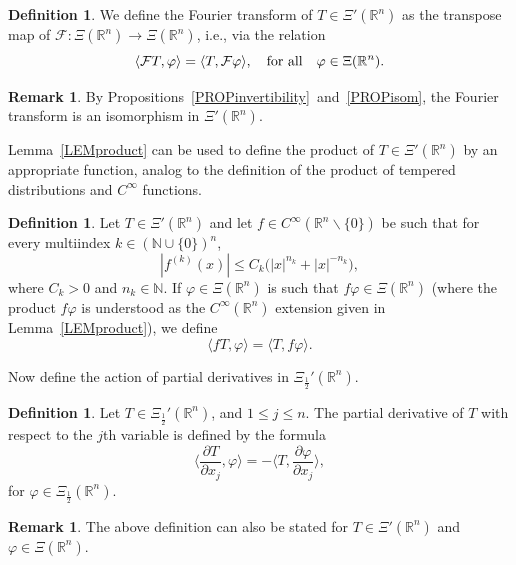 \documentclass[reqno,11pt]{amsart}
\theoremstyle{definition}
\newtheorem{definition}[theorem]{Definition}
\newtheorem{remark}[theorem]{Remark}
\def\R{\mathbb{R}}
\begin{document}
\begin{definition}\label{ALBERTO}
	We define the Fourier  transform of $ T\in \Xi'(\R^n)$ as the transpose map of $\mathcal{F}:\Xi(\R^n)\to \Xi(\R^n)$, i.e., via the relation
	\[
	\langle \mathcal{F}T,\varphi \rangle = \langle T,\mathcal{F}\varphi\rangle,\ \ \ {\rm for\ all}\ \ \ \varphi\in\Xi(\R^n).
	\]
\end{definition}
\begin{remark}
	By Propositions~\ref{PROPinvertibility}~and~\ref{PROPisom}, the Fourier transform is an isomorphism in $\Xi'(\R^n)$.
\end{remark}

Lemma~\ref{LEMproduct} can be used to define the product of $T\in \Xi'(\R^n)$ by an appropriate function, analog to the definition of the product of tempered distributions and $C^\infty$ functions.
\begin{definition}\label{DEFproddistbyfunct}
	Let $T\in \Xi'(\R^n)$ and let $f\in C^\infty(\R^n\backslash\{0\})$ be such that for every multiindex $k\in (\mathbb{N}\cup\{0\})^n$,
	\begin{equation}
		\label{EQfderivatives}
		|f^{(k)}(x)|\leq C_k\big( |x|^{n_k}+|x|^{-n_k}\big),
	\end{equation}
	where $C_k>0$ and $n_k\in\mathbb{N}$. If $\varphi\in \Xi(\R^n)$ is such that $f\varphi\in \Xi(\R^n)$ (where the product $f\varphi$ is understood as the $C^{\infty}(\R^n)$ extension given in Lemma~\ref{LEMproduct}), we define
	\[
	\langle fT,\varphi\rangle =\langle T,f\varphi\rangle.
	\]
\end{definition}



Now define the action of partial derivatives in $\Xi_\frac{1}{2}'(\R^n)$.
\begin{definition}\label{DEFderivativepsi}
	Let $T\in  \Xi_\frac{1}{2}'(\R^n)$, and $1\leq j\leq n$. The partial derivative of $T$ with respect to the $j$th variable is defined by the formula
	\[
	\bigg\langle \frac{\partial T}{\partial {x_j}},\varphi \bigg\rangle  = -\bigg\langle T, \frac{\partial \varphi}{\partial {x_j}} \bigg\rangle,
	\]
	for $\varphi\in \Xi_\frac{1}{2}(\R^n)$.
\end{definition}

\begin{remark}
\label{der1}
The above definition can also be stated for $T\in\Xi'(\mathbb{R}^n)$ and $\varphi\in\Xi(\mathbb{R}^n)$.
\end{remark}
\end{document}
